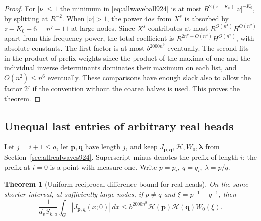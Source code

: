 \documentclass[a4paper,11pt]{article}
\newtheorem{theorem}[proposition]{Theorem}
\theoremstyle{definition}
\theoremstyle{remark}
\numberwithin{equation}{section}
\begin{document}
\begin{proof}
For \(|\nu|\le1\) the minimum in \eqref{eq:allwaveball924} is at
most \(R^{2(z-K_0)}|\nu|^{-K_0}\), by splitting at \(R^{-2}\).
When \(|\nu|>1\), the power \(4as\) from \(X^s\) is absorbed
by \(z-K_0-6=n^7-11\) at large nodes. Since \(X^s\) contributes
at most \(R^{O(n^4)}H^{O(n^2)}\) apart from this frequency
power, the total coefficient is
\(R^{2n^7+O(n^4)}H^{O(n^2)}\), with absolute constants.
The first factor is at most \(b^{2000n^9}\) eventually.
The second fits in the product of prefix weights since the
product of the maxima of one and the individual inverse
determinants dominates their maximum on each list, and
\(O(n^2)\le n^6\) eventually. These comparisons have enough
slack also to allow the factor \(2^j\) if the convention
without the coarea halves is used. This proves the theorem.
\end{proof}
\clearpage

\subsection{Unequal last entries of arbitrary real heads}
\label{sec:allmismatch925}

Let \(j=i+1\le a\), let \(\mathbf p,\mathbf q\) have length \(j\),
and keep \(J_{\mathbf p,\mathbf q},\mathcal H,W_0,\boldsymbol\lambda\)
from Section~\ref{sec:allrealwaves924}. Superscript minus denotes
the prefix of length \(i\); the prefix at \(i=0\) is a point
with measure one. Write \(p=p_i,\ q=q_i,\ \lambda=p/q\).

\begin{theorem}[Uniform reciprocal-difference bound for real heads]
\leavevmode\label{thm:allmismatch925}
On the same shorter interval, at sufficiently large nodes,
if \(p\ne q\) and \(\xi=p^{-1}-q^{-1}\), then
\[
 \frac1{d_v S_{k,a}}\int_G |J_{\mathbf p,\mathbf q}(x;0)|\,dx
 \le b^{2000n^9}\mathcal H(\mathbf p)\mathcal H(\mathbf q)W_0(\xi).
\]
\end{theorem}
\end{document}
